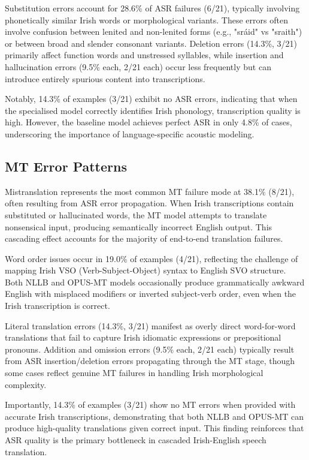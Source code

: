\documentclass[11pt]{article}
\begin{document}
Substitution errors account for 28.6\% of ASR failures (6/21), typically involving phonetically similar Irish words or morphological variants. These errors often involve confusion between lenited and non-lenited forms (e.g., "sráid" vs "sraith") or between broad and slender consonant variants. Deletion errors (14.3\%, 3/21) primarily affect function words and unstressed syllables, while insertion and hallucination errors (9.5\% each, 2/21 each) occur less frequently but can introduce entirely spurious content into transcriptions.

Notably, 14.3\% of examples (3/21) exhibit no ASR errors, indicating that when the specialised model correctly identifies Irish phonology, transcription quality is high. However, the baseline model achieves perfect ASR in only 4.8\% of cases, underscoring the importance of language-specific acoustic modeling.

\subsection{MT Error Patterns}

Mistranslation represents the most common MT failure mode at 38.1\% (8/21), often resulting from ASR error propagation. When Irish transcriptions contain substituted or hallucinated words, the MT model attempts to translate nonsensical input, producing semantically incorrect English output. This cascading effect accounts for the majority of end-to-end translation failures.

Word order issues occur in 19.0\% of examples (4/21), reflecting the challenge of mapping Irish VSO (Verb-Subject-Object) syntax to English SVO structure. Both NLLB and OPUS-MT models occasionally produce grammatically awkward English with misplaced modifiers or inverted subject-verb order, even when the Irish transcription is correct.

Literal translation errors (14.3\%, 3/21) manifest as overly direct word-for-word translations that fail to capture Irish idiomatic expressions or prepositional pronouns. Addition and omission errors (9.5\% each, 2/21 each) typically result from ASR insertion/deletion errors propagating through the MT stage, though some cases reflect genuine MT failures in handling Irish morphological complexity.

Importantly, 14.3\% of examples (3/21) show no MT errors when provided with accurate Irish transcriptions, demonstrating that both NLLB and OPUS-MT can produce high-quality translations given correct input. This finding reinforces that ASR quality is the primary bottleneck in cascaded Irish-English speech translation.
\end{document}
